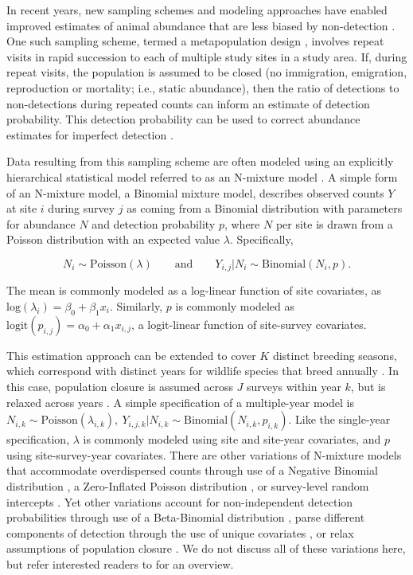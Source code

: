 \documentclass{article}
\begin{document}
In recent years, new sampling schemes and modeling approaches have enabled improved estimates of animal abundance that are less biased by non-detection \citep{Denes_Silveira_Beissinger_2015}. One such sampling scheme, termed a metapopulation design \citep{Kery_Royle_2010}, involves repeat visits in rapid succession to each of multiple study sites in a study area. If, during repeat visits, the population is assumed to be closed (no immigration, emigration, reproduction or mortality; i.e., static abundance), then the ratio of detections to non-detections during repeated counts can inform an estimate of detection probability. This detection probability can be used to correct abundance estimates for imperfect detection \citep{Royle_2004}.

Data resulting from this sampling scheme are often modeled using an explicitly hierarchical statistical model referred to as an N-mixture model \citep{Royle_Nichols_2003, Dodd_Dorazio_2004, Royle_2004, Kery_Royle_Schmid_2005}. A simple form of an N-mixture model, a Binomial mixture model, describes observed counts $Y$ at site $i$ during survey $j$ as coming from a Binomial distribution with parameters for abundance $N$ and detection probability $p$, where $N$ per site is drawn from a Poisson distribution with an expected value $\lambda$. Specifically,

$$N_i \sim \text{Poisson}(\lambda) \qquad \text{and} \qquad  Y_{i,j} | N_i \sim \text{Binomial}(N_i, p).$$

The mean is commonly modeled as a log-linear function of site covariates, as $\text{log}(\lambda_i) = \beta_0 + \beta_1x_i$. Similarly, $p$ is commonly modeled as $\text{logit}(p_{i,j}) = \alpha_0 + \alpha_1x_{i,j}$, a logit-linear function of site-survey covariates.

This estimation approach can be extended to cover $K$ distinct breeding seasons, which correspond with distinct years for wildlife species that breed annually \citep{Kery_Dorazio_Soldaat_Van_Strien_Zuiderwijk_Royle_2009}. In this case, population closure is assumed across $J$ surveys within year $k$, but is relaxed across years \citep{Kery_Dorazio_Soldaat_Van_Strien_Zuiderwijk_Royle_2009}. A simple specification of a multiple-year model is $N_{i,k} \sim \text{Poisson}(\lambda_{i,k}), \ Y_{i,j,k} | N_{i,k} \sim \text{Binomial}(N_{i,k}, p_{i,k})$. Like the single-year specification, $\lambda$ is commonly modeled using site and site-year covariates, and $p$ using site-survey-year covariates. There are other variations of N-mixture models that accommodate overdispersed counts through use of a Negative Binomial distribution \citep{Kery_Royle_2010}, a Zero-Inflated Poisson distribution \citep{Wenger_Freeman_2008}, or survey-level random intercepts \citep{Kery_Schaub_2011}. Yet other variations account for non-independent detection probabilities through use of a Beta-Binomial distribution \citep{Martin_Royle_Mackenzie_Edwards_Kery_Gardner_2011}, parse different components of detection through the use of unique covariates \citep{O'Donnell_Thompson_III_Semlitsch_2015}, or relax assumptions of population closure \citep{Chandler_Royle_King_2011, Dail_Madsen_2011}. We do not discuss all of these variations here, but refer interested readers to \cite{Denes_Silveira_Beissinger_2015} for an overview.
\end{document}
